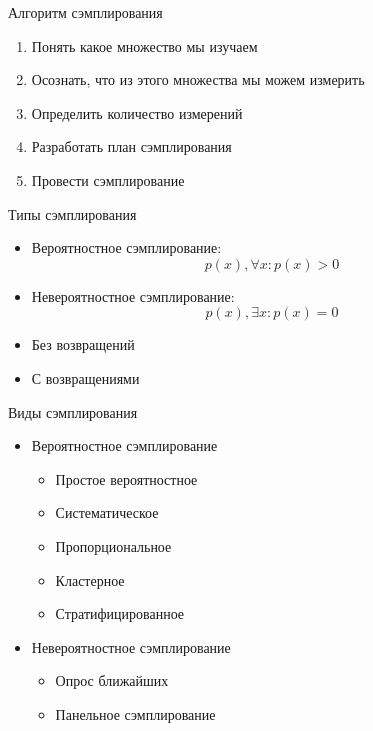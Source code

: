 \documentclass[14pt, fleqn, xcolor={dvipsnames, table}]{beamer}
\begin{document}
\begin{frame}{Алгоритм сэмплирования}
\begin{enumerate}
   \item Понять какое множество мы изучаем
   \item Осознать, что из этого множества мы можем измерить
   \item Определить количество измерений
   \item Разработать план сэмплирования
   \item Провести сэмплирование
\end{enumerate}
\end{frame}

\begin{frame}{Типы сэмплирования}
\begin{itemize}
   \item Вероятностное сэмплирование: 
   $$
   p(x),\forall x:p(x) > 0
   $$
   \item Невероятностное сэмплирование:
   $$
   p(x), \exists x: p(x) = 0
   $$
   \item Без возвращений
   \item С возвращениями
\end{itemize}
\end{frame}

\begin{frame}{Виды сэмплирования}
\begin{itemize}
   \item Вероятностное сэмплирование
   \begin{itemize}
    \item Простое вероятностное
    \item Систематическое
    \item Пропорциональное
    \item Кластерное
    \item Стратифицированное
   \end{itemize}
   \item Невероятностное сэмплирование
   \begin{itemize}
    \item Опрос ближайших
    \item Панельное сэмплирование
   \end{itemize}
\end{itemize}
\end{frame}
\end{document}
